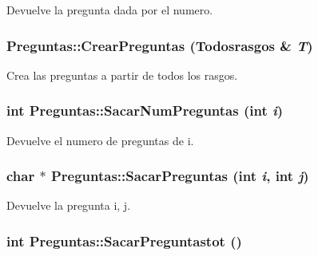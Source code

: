 Devuelve la pregunta dada por el numero. 

\hypertarget{class_preguntas_3a3fa67dfed70abb2b102192d4057070}{
\subsubsection[{CrearPreguntas}]{ Preguntas::CrearPreguntas ({\bf Todosrasgos} \& {\em T})}}
\label{class_preguntas_3a3fa67dfed70abb2b102192d4057070}


Crea las preguntas a partir de todos los rasgos. 

\hypertarget{class_preguntas_eb559e49da8aed155c2ce5acfe2a62a7}{
\subsubsection[{SacarNumPreguntas}]{\setlength{\rightskip}{0pt plus 5cm}int Preguntas::SacarNumPreguntas (int {\em i})}}
\label{class_preguntas_eb559e49da8aed155c2ce5acfe2a62a7}


Devuelve el numero de preguntas de i. 

\hypertarget{class_preguntas_d624e3ca649ba38d0f40ae8751353003}{
\subsubsection[{SacarPreguntas}]{\setlength{\rightskip}{0pt plus 5cm}char $\ast$ Preguntas::SacarPreguntas (int {\em i}, \/  int {\em j})}}
\label{class_preguntas_d624e3ca649ba38d0f40ae8751353003}


Devuelve la pregunta i, j. 

\hypertarget{class_preguntas_2e3a06157b2c7dc8ed1de3e32d20fd6d}{
\subsubsection[{SacarPreguntastot}]{\setlength{\rightskip}{0pt plus 5cm}int Preguntas::SacarPreguntastot ()}}
\label{class_preguntas_2e3a06157b2c7dc8ed1de3e32d20fd6d}


